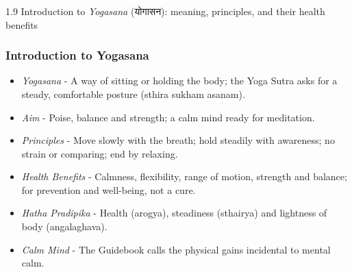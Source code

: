 


\begin{frame}[fragile]\frametitle{}
\begin{center}
{\Large 1.9 Introduction to \textit{Yogasana} (योगासन): meaning, principles, and their health benefits}
\end{center}
\end{frame}

\begin{frame}[fragile]\frametitle{Introduction to Yogasana}

  \begin{itemize}
	\item \textit{Yogasana} - A way of sitting or holding the body; the Yoga Sutra asks for a steady, comfortable posture (sthira sukham asanam).
	\item \textit{Aim} - Poise, balance and strength; a calm mind ready for meditation.
	\item \textit{Principles} - Move slowly with the breath; hold steadily with awareness; no strain or comparing; end by relaxing.
	\item \textit{Health Benefits} - Calmness, flexibility, range of motion, strength and balance; for prevention and well-being, not a cure.
	\item \textit{Hatha Pradipika} - Health (arogya), steadiness (sthairya) and lightness of body (angalaghava).
	\item \textit{Calm Mind} - The Guidebook calls the physical gains incidental to mental calm.
  \end{itemize}

\end{frame}

